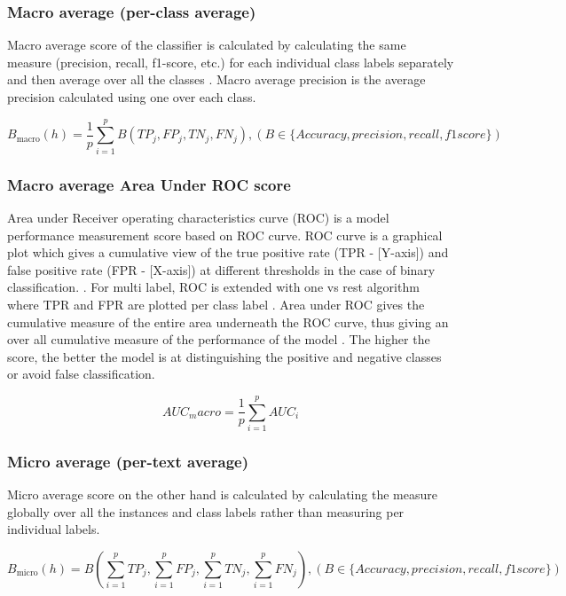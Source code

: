 \subsubsection{Macro average (per-class average)}
Macro average score of the classifier is calculated by calculating the same measure (precision, recall, f1-score, etc.) for each individual class labels separately and then average over all the classes \cite{sorower2010literature}. Macro average precision is the average precision calculated using one over each class. 

$$B_\mathrm{macro}(h) = \frac{1}{p}\sum_{i =1}^{p}B(TP_j,FP_j,TN_j,FN_j), (B\in \{Accuracy,precision,recall,f1score\})$$ \cite{zhang2010multi}

\subsubsection{Macro average Area Under ROC score}
Area under Receiver operating characteristics curve (ROC) is a model performance measurement score based on ROC curve. ROC curve is a graphical plot which gives a cumulative view of the true positive rate (TPR - [Y-axis]) and false positive rate (FPR - [X-axis]) at different thresholds in the case of binary classification. \cite{zhang2013review}. For multi label, ROC is  extended with one vs rest algorithm where TPR and FPR are plotted per class label \cite{aggarwal2012survey}. Area under ROC gives the cumulative measure of the entire area underneath the ROC curve, thus giving an over all cumulative measure of the performance of the model \cite{aggarwal2012survey}. The higher the score, the better the model is at distinguishing the positive and negative classes or avoid false classification\cite{sokolova2009systematic}. 

$$AUC_macro = \frac{1}{p}\sum_{i =1}^{p} AUC_i$$
\cite{zhang2010multi}

\subsubsection{Micro average (per-text average)}
Micro average score on the other hand is calculated by calculating the measure globally over all the instances and class labels rather than measuring per individual labels.

$$B_\mathrm{micro}(h) = B\left(\sum_{i =1}^{p}TP_j,\sum_{i =1}^{p}FP_j,\sum_{i =1}^{p}TN_j,\sum_{i =1}^{p}FN_j\right), (B\in \{Accuracy,precision,recall,f1score\})$$ \cite{zhang2010multi}
